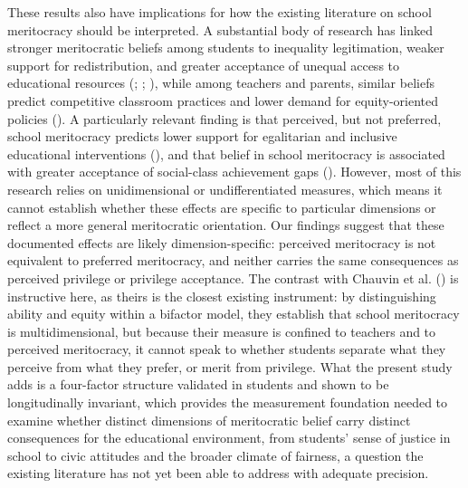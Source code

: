 \documentclass[
  13pt,
]{article}
\begin{document}
These results also have implications for how the existing literature on
school meritocracy should be interpreted. A substantial body of research
has linked stronger meritocratic beliefs among students to inequality
legitimation, weaker support for redistribution, and greater acceptance
of unequal access to educational resources
(;
;
), while
among teachers and parents, similar beliefs predict competitive
classroom practices and lower demand for equity-oriented policies
(). A
particularly relevant finding is that perceived, but not preferred,
school meritocracy predicts lower support for egalitarian and inclusive
educational interventions (), and that belief in school meritocracy is
associated with greater acceptance of social-class achievement gaps
().
However, most of this research relies on unidimensional or
undifferentiated measures, which means it cannot establish whether these
effects are specific to particular dimensions or reflect a more general
meritocratic orientation. Our findings suggest that these documented
effects are likely dimension-specific: perceived meritocracy is not
equivalent to preferred meritocracy, and neither carries the same
consequences as perceived privilege or privilege acceptance. The
contrast with Chauvin et al. ()
is instructive here, as theirs is the closest existing instrument: by
distinguishing ability and equity within a bifactor model, they
establish that school meritocracy is multidimensional, but because their
measure is confined to teachers and to perceived meritocracy, it cannot
speak to whether students separate what they perceive from what they
prefer, or merit from privilege. What the present study adds is a
four-factor structure validated in students and shown to be
longitudinally invariant, which provides the measurement foundation
needed to examine whether distinct dimensions of meritocratic belief
carry distinct consequences for the educational environment, from
students' sense of justice in school to civic attitudes and the broader
climate of fairness, a question the existing literature has not yet been
able to address with adequate precision.
\end{document}
